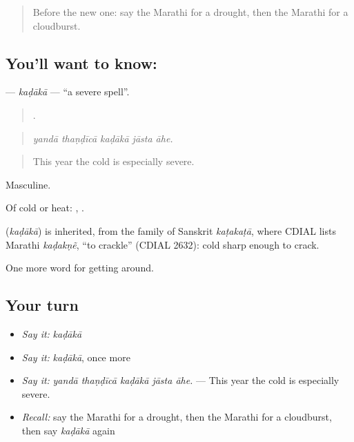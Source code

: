 \label{lesson:MR-C440-kadaka}



\begin{quote}
Before the new one: say the Marathi for a drought, then the Marathi for a cloudburst.
\end{quote}

\subsection*{You'll want to know: }
\textbf{} — \emph{kaḍākā} — \textquotedblleft{}a severe spell\textquotedblright{}.

\begin{quote}
    .
\end{quote}

\begin{quote}
\emph{yandā thaṇḍīcā kaḍākā jāsta āhe.}
\end{quote}

\begin{quote}
This year the cold is especially severe.
\end{quote}

Masculine.

Of cold or heat:  ,  .

\begin{cousinweb}
\textbf{} (\emph{kaḍākā}) is inherited, from the family of Sanskrit \emph{kaṭakaṭā}, where CDIAL lists Marathi \emph{kaḍakṇẽ}, \textquotedblleft{}to crackle\textquotedblright{} (CDIAL 2632): cold sharp enough to crack.
\end{cousinweb}

\begin{grammarlens}[title={What you've built}]
One more word for getting around.
\end{grammarlens}

\subsection*{Your turn}
\begin{itemize}
\raggedright
  \item \emph{Say it:} \emph{kaḍākā}
  \item \emph{Say it:} \emph{kaḍākā}, once more
  \item \emph{Say it:} \emph{yandā thaṇḍīcā kaḍākā jāsta āhe.} — This year the cold is especially severe.
  \item \emph{Recall:} say the Marathi for a drought, then the Marathi for a cloudburst, then say \emph{kaḍākā} again
\end{itemize}

